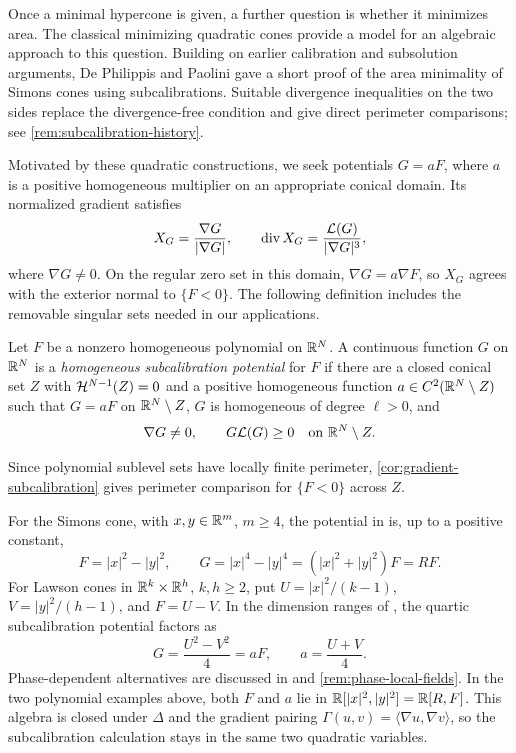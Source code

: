 Once a minimal hypercone is given, a further question is whether it
minimizes area. The classical minimizing quadratic cones
\cite{BDGG69,Lawson72,Simoes73} provide a model for an algebraic
approach to this question. Building on earlier calibration and
subsolution arguments, De Philippis and Paolini
\cite{DePhilippisPaolini} gave a short proof of the area minimality
of Simons cones using subcalibrations. Suitable divergence inequalities
on the two sides replace the divergence-free condition and give direct
perimeter comparisons; see \cref{rem:subcalibration-history}.

Motivated by these quadratic constructions, we seek potentials
\(G=aF\), where \(a\) is a positive homogeneous multiplier on an
appropriate conical domain. Its normalized gradient satisfies
\begin{equation}\label{eq:div-normalized-gradient}
 X_G=\frac{\nabla G}{|\nabla G|},\qquad
 \operatorname{div} X_G=\frac{\mathcal L(G)}{|\nabla G|^3},
\end{equation}
where \(\nabla G\ne0\). On the regular zero set in this domain,
\(\nabla G=a\nabla F\), so \(X_G\) agrees
with the exterior normal to \(\{F<0\}\). The following definition
includes the removable singular sets needed in our applications.

\begin{definition}
\label{def:homogeneous-subcalibration-potential}
Let \(F\) be a nonzero homogeneous polynomial on \(\mathbb R^N\).
A continuous function \(G\) on \(\mathbb R^N\) is a
\emph{homogeneous subcalibration potential} for \(F\) if there are
a closed conical set \(Z\) with \(\mathcal H^{N-1}(Z)=0\) and a positive
homogeneous function \(a\in C^2(\mathbb R^N\setminus Z)\) such that
\(G=aF\) on \(\mathbb R^N\setminus Z\), \(G\) is homogeneous of degree
\(\ell>0\), and
\begin{equation}\label{eq:master-sign}
 \nabla G\ne0,\qquad G\mathcal L(G)\ge0
 \quad\text{on }\mathbb R^N\setminus Z.
\end{equation}
\end{definition}

Since polynomial sublevel sets have locally finite perimeter,
\cref{cor:gradient-subcalibration} gives perimeter comparison
for \(\{F<0\}\) across \(Z\).

For the Simons cone, with \(x,y\in\mathbb R^m\), \(m\ge4\), the potential
in \cite[Section~2]{DePhilippisPaolini} is, up to a positive constant,
\[
 F=|x|^2-|y|^2,\qquad
 G=|x|^4-|y|^4=(|x|^2+|y|^2)F=RF.
\]
For Lawson cones in \(\mathbb R^k\times\mathbb R^h\), \(k,h\ge2\), put
\(U=|x|^2/(k-1)\), \(V=|y|^2/(h-1)\), and \(F=U-V\).
In the dimension ranges of
\cite[Lemma~4.1, equation~(4.7)]{DePhilippisMaggi14}, the quartic
subcalibration potential factors as
\begin{equation}\label{eq:intro-Lawson-multiplier}
 G=\frac{U^2-V^2}{4}=aF,\qquad a=\frac{U+V}{4}.
\end{equation}
Phase-dependent alternatives are discussed in \cite{Liu19} and
\cref{rem:phase-local-fields}.
In the two polynomial examples above, both \(F\) and \(a\) lie in
\(\mathbb R[|x|^2,|y|^2]=\mathbb R[R,F]\). This algebra is closed under
\(\Delta\) and the gradient pairing
\(\Gamma(u,v)=\langle\nabla u,\nabla v\rangle\), so the
subcalibration calculation stays in the same two quadratic variables.

